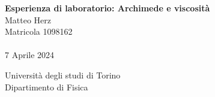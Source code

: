 \begin{titlepage}
	\begin{center}
		\vspace*{4cm}
		
		\textbf{\LARGE Esperienza di laboratorio: Archimede e viscosità}\\
		\vspace{1cm}
		{\LARGE Matteo Herz} \\
		\vspace*{0.2cm}
		{\normalsize  Matricola 1098162}\\
		\vspace{1cm}
         \\
        \vspace{1cm}
		{\large 7 Aprile 2024}
		\vspace{2.7cm}
		
		\vfill   %
		
		\vspace{0.5cm}
		
		{\small Università degli studi di Torino}\\
		{\small Dipartimento di Fisica}\\
		\vspace*{0.1cm}
		
	\end{center}
\end{titlepage}

